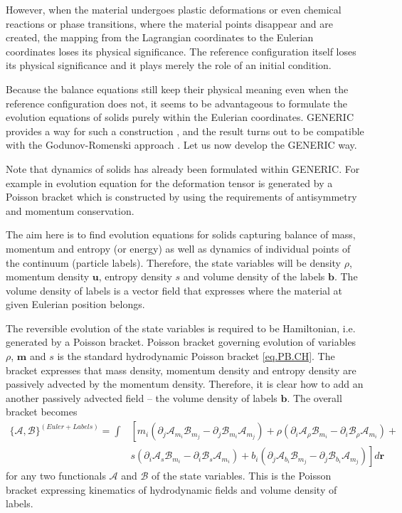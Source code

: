 \documentclass[twoside]{article}
\newcommand{\rr}{{\boldsymbol{r}}}
\newcommand{\bb}{{\boldsymbol{b}}}
\newcommand{\mm}{{\boldsymbol{m}}}
\newcommand{\uu}{{\boldsymbol{u}}}
\newcommand{\AF}{\mathscr{A}}
\newcommand{\BF}{\mathscr{B}}
\newcommand{\pd}{\partial}
\begin{document}
However, when the material undergoes plastic deformations or even 
chemical reactions or phase transitions, where the material points disappear 
and are created, the mapping from the Lagrangian coordinates to the Eulerian 
coordinates loses its physical significance. The reference configuration itself 
loses its physical significance and it plays merely the role of an initial 
condition. 

Because the balance equations still keep their physical meaning even when the 
reference configuration does not, it seems to be advantageous to formulate the 
evolution equations of solids purely within the Eulerian coordinates. GENERIC 
provides a way for such a construction \cite{Miroslav-PLA}, and the result 
turns out to be compatible with the Godunov-Romenski approach 
\cite{GodRom1972,God1978,GodPesh2010,BartonRom2010,Favrie2011,HPR2016,DPRZ2016,HYP2016}.
Let us now develop the GENERIC way. 

Note that dynamics of solids has already been formulated within GENERIC. For example in 
\cite{hutter-plastic} evolution equation for the deformation tensor is generated by a 
Poisson bracket which is constructed by using the requirements of antisymmetry and momentum conservation.

The aim here is to find evolution equations for solids capturing balance of mass, 
momentum and entropy (or energy) as well as dynamics of individual points of 
the continuum (particle labels). Therefore, the state variables will be density $\rho$, momentum 
density $\uu$, entropy density $s$ and volume density of the labels $\bb$. The 
volume density of labels is a vector field that expresses where the material at 
given Eulerian position belongs. 

The reversible evolution of the state variables is required to be Hamiltonian, 
i.e. generated by a Poisson bracket. Poisson bracket governing evolution of 
variables $\rho$, $\mm$ and $s$ is the standard hydrodynamic Poisson bracket 
\eqref{eq.PB.CH}. The bracket expresses that mass density, momentum density 
and entropy density are passively advected by the momentum density. 
Therefore, it is clear how to add an another passively advected field -- the 
volume density of labels $\bb$. The overall bracket becomes
\begin{align}\label{eq.PB.CHL}
\{\AF,\BF\}^{(Euler + Labels)} = \int &\left[ m_i(\pd_j \AF_{m_i} 
\BF_{m_j}-\pd_j 
\BF_{m_i}\AF_{m_j}) + \rho(\pd_i \AF_\rho 
\BF_{m_i}-\pd_i 
\BF_\rho \AF_{m_i})
+
\right.\nonumber\\
%
& \left. s(\pd_i \AF_s \BF_{m_i}-\pd_i \BF_s \AF_{m_i})
+b_i(\pd_j \AF_{b_i}\BF_{m_j} - \pd_j \BF_{b_i}\AF_{m_j}) \right] d\rr 
\end{align}
for any two functionals $\AF$ and $\BF$ of the state variables. This is the 
Poisson bracket expressing kinematics of hydrodynamic fields and volume density 
of labels.
\end{document}
